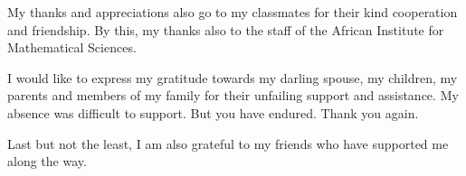 My thanks and appreciations also go to my classmates for their kind cooperation and friendship. By this, my thanks also to the staff of the African Institute for Mathematical Sciences.

I would like to express my gratitude towards  my darling spouse, my children, my parents and members  of my family for their unfailing support and assistance. My absence was difficult to support. But you have endured. Thank you again.

Last but not the least, I am also grateful to my friends who have supported me along the way.


